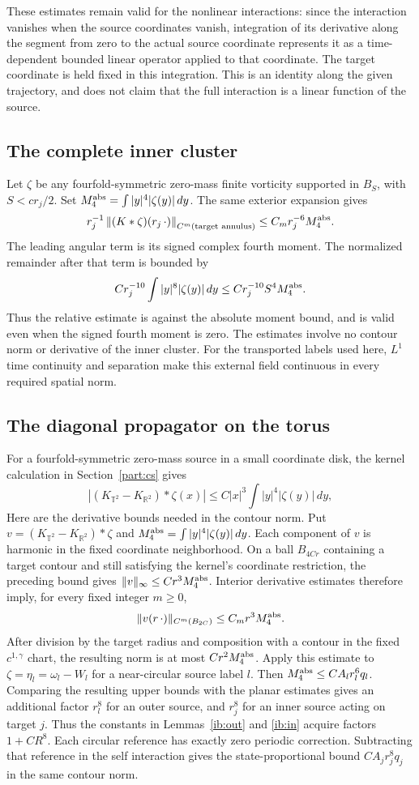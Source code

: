 \documentclass[11pt]{amsart}
\theoremstyle{remark}
\numberwithin{equation}{section}
\newcommand{\norm}[1]{\left\lVert#1\right\rVert}
\begin{document}
These estimates remain valid for the nonlinear interactions: since the interaction vanishes when the source coordinates vanish, integration of its derivative along the segment from zero to the actual source coordinate represents it as a time-dependent bounded linear operator applied to that coordinate. The target coordinate is held fixed in this integration. This is an identity along the given trajectory, and does not claim that the full interaction is a linear function of the source.

\subsection{The complete inner cluster}
Let $\zeta$ be any fourfold-symmetric zero-mass finite vorticity supported in $B_S$, with $S<cr_j/2$. Set $M_{4}^{\rm abs}=\int |y|^4|\zeta(y)|\,dy$. The same exterior expansion gives
\[
 r_j^{-1}\norm{(K*\zeta)(r_j\,\cdot)}_{C^m(\text{target annulus})}
 \le C_m r_j^{-6}M_4^{\rm abs}.
\]
The leading angular term is its signed complex fourth moment. The normalized remainder after that term is bounded by
\[
 C r_j^{-10}\int |y|^8|\zeta(y)|\,dy
 \le C r_j^{-10}S^4 M_4^{\rm abs}.
\]
Thus the relative estimate is against the absolute moment bound, and is valid even when the signed fourth moment is zero. The estimates involve no contour norm or derivative of the inner cluster. For the transported labels used here, $L^1$ time continuity and separation make this external field continuous in every required spatial norm.

\subsection{The diagonal propagator on the torus}
For a fourfold-symmetric zero-mass source in a small coordinate disk, the kernel calculation in Section~\ref{part:cs} gives
\[
 |(K_{\mathbb T^2}-K_{\mathbb R^2})*\zeta(x)|
 \le C|x|^3\int |y|^4|\zeta(y)|\,dy,
\]
Here are the derivative bounds needed in the contour norm. Put
$v=(K_{\mathbb T^2}-K_{\mathbb R^2})*\zeta$ and
$M_4^{\rm abs}=\int |y|^4|\zeta(y)|\,dy$. Each component of $v$
is harmonic in the fixed coordinate neighborhood. On a ball
$B_{4Cr}$ containing a target contour and still satisfying the
kernel's coordinate restriction, the preceding bound gives
$\|v\|_\infty\le Cr^3M_4^{\rm abs}$. Interior derivative estimates
therefore imply, for every fixed integer $m\ge0$,
\[
 \|v(r\,\cdot)\|_{C^m(B_{2C})}
       \le C_m r^3M_4^{\rm abs}.
\]
After division by the target radius and composition with a contour
in the fixed $c^{1,\gamma}$ chart, the resulting norm is at most
$Cr^2M_4^{\rm abs}$. Apply this estimate to
$\zeta=\eta_l=\omega_l-W_l$ for a near-circular source label $l$.
Then $M_4^{\rm abs}\le CA_lr_l^6q_l$. Comparing the resulting upper
bounds with the planar estimates gives an additional factor
$r_l^8$ for an outer source, and $r_j^8$ for an inner source acting
on target $j$. Thus the constants in Lemmas~\ref{ib:out} and
\ref{ib:in} acquire factors $1+CR^8$. Each circular reference has
exactly zero periodic correction. Subtracting that reference in
the self interaction gives the state-proportional bound
$CA_jr_j^8q_j$ in the same contour norm.
\end{document}

